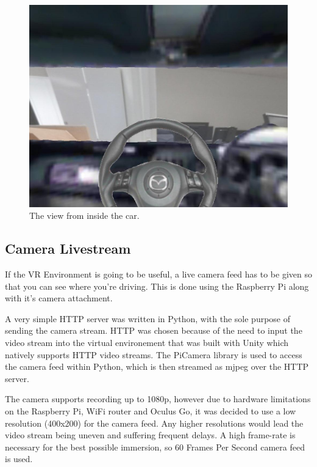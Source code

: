\begin{figure}[H]
  \centering \includegraphics[width=\textwidth / 2]{./inside_car.jpg}
  \caption{\label{fig:inside_car} The view from inside the car.}
\end{figure}


\subsection{Camera Livestream}\label{sec:design_camera_livestream}

If the VR Environment is going to be useful, a live camera feed has to be given
so that you can see where you're driving. This is done using the Raspberry Pi
along with it's camera attachment.

A very simple HTTP server was written in Python, with the sole purpose of
sending the camera stream. HTTP was chosen because of the need to input the video stream into the virtual environement that was built with Unity which natively supports HTTP video streams. The PiCamera library \cite{picamera} is used to
access the camera feed within Python, which is then streamed as mjpeg over the
HTTP server.

The camera supports recording up to 1080p, however due to hardware limitations
on the Raspberry Pi, WiFi router and Oculus Go, it was decided to use a
low resolution (400x200) for the camera feed. Any higher resolutions would
lead the video stream being uneven and suffering frequent delays.  A high
frame-rate is necessary for the best possible immersion, so 60 Frames Per
Second camera feed is used.
